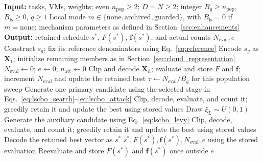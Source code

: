 \documentclass[pdflatex,onecolumn,sn-mathphys-num]{sn-jnl}
\begin{document}
\begin{algorithm}[p]
\caption{Cloud LSCBO with archived and recommended guarded pair reassignment}\label{alg:lscbo}
\small
\begin{algorithmic}[1]
\Statex \textbf{Input:} tasks, VMs, weights; even $n_{\mathrm{pop}}\geq2$; $D=N\geq2$; integer $B_g\geq n_{\mathrm{pop}}$, $B_{\mathrm{ls}}\geq0$, $q\geq1$
\Statex Local mode $m\in\{\text{none},\text{archived},\text{guarded}\}$, with $B_{\mathrm{ls}}=0$ if $m=\text{none}$; mechanism parameters as defined in Section~\ref{sec:enhancements}
\Statex \textbf{Output:} retained schedule $s^*$, $F(s^*)$, $\mathbf{f}(s^*)$, and actual counts $N_{\mathrm{eval}},e$
\State Construct $s_g$; fix its reference denominators using Eq.~\eqref{eq:reference}
\State Encode $s_g$ as $\mathbf{X}_1$; initialize remaining members as in Section~\ref{sec:cloud_representation}
\State $N_{\mathrm{eval}}\leftarrow0$; $e\leftarrow0$; $n_{\mathrm{att}}\leftarrow0$
    \State Clip and decode $\mathbf{X}_h$; evaluate and store $F$ and $\mathbf{f}$; increment $N_{\mathrm{eval}}$ and update the retained best
\EndFor
{}
    \State $\tau\leftarrow N_{\mathrm{eval}}/B_g$ for this population sweep
        \State Generate one primary candidate using the selected stage in Eqs.~\eqref{eq:lscbo_search}--\eqref{eq:lscbo_attack}
        \State Clip, decode, evaluate, and count it; greedily retain it and update the best using stored values
            \State Draw $\xi_L\sim U(0,1)$
                \State Generate the auxiliary candidate using Eq.~\eqref{eq:lscbo_levy}
                \State Clip, decode, evaluate, and count it; greedily retain it and update the best using stored values
            \EndIf
        \EndIf
    \EndFor
\EndWhile
\State Decode the retained best vector as $s^*$
    \State \Return $s^*,F(s^*),\mathbf{f}(s^*),N_{\mathrm{eval}},e$ using the stored evaluation
\EndIf
\State Reevaluate and store $F(s^*)$ and $\mathbf{f}(s^*)$ once outside $e$
\end{algorithmic}
\end{algorithm}
\end{document}
